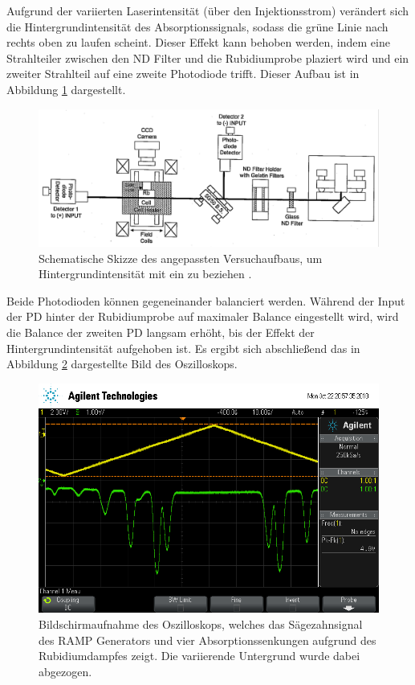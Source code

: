 Aufgrund der variierten Laserintensität (über den Injektionsstrom) verändert sich
die Hintergrundintensität des Absorptionssignals, sodass die grüne Linie nach
rechts oben zu laufen scheint. Dieser Effekt kann behoben werden, indem eine
Strahlteiler zwischen den ND Filter und die Rubidiumprobe plaziert wird und
ein zweiter Strahlteil auf eine zweite Photodiode trifft. Dieser Aufbau
ist in Abbildung \ref{fig:SetupImproved} dargestellt.

\begin{figure}
	\centering
	\includegraphics[width=\textwidth, angle=1, origin=c]{images/SetupImproved.pdf}
	\caption{Schematische Skizze des angepassten Versuchaufbaus,
	um Hintergrundintensität mit ein zu beziehen \cite{anleitung}.}
	\label{fig:SetupImproved}
\end{figure}

Beide Photodioden können gegeneinander balanciert werden.
Während der Input der PD hinter der
Rubidiumprobe auf maximaler Balance eingestellt wird, wird die
Balance der zweiten PD langsam erhöht, bis der Effekt der Hintergrundintensität
aufgehoben ist.
Es ergibt sich abschließend das in Abbildung \ref{fig:final-signal} dargestellte
Bild des Oszilloskops.

\begin{figure}
	\centering
	\includegraphics[width=.8\textwidth]{images/final-signal.png}
	\caption{Bildschirmaufnahme des Oszilloskops, welches das Sägezahnsignal des
	RAMP Generators und vier Absorptionssenkungen aufgrund des Rubidiumdampfes zeigt.
	Die variierende Untergrund wurde dabei abgezogen.}
	\label{fig:final-signal}
\end{figure}
